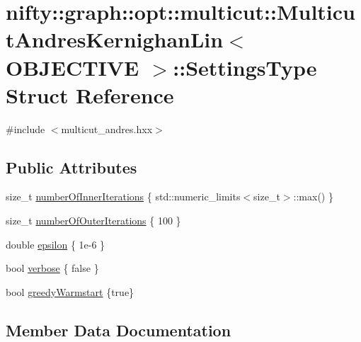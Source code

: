 \hypertarget{structnifty_1_1graph_1_1opt_1_1multicut_1_1MulticutAndresKernighanLin_1_1SettingsType}{}\section{nifty\+:\+:graph\+:\+:opt\+:\+:multicut\+:\+:Multicut\+Andres\+Kernighan\+Lin$<$ O\+B\+J\+E\+C\+T\+I\+VE $>$\+:\+:Settings\+Type Struct Reference}
\label{structnifty_1_1graph_1_1opt_1_1multicut_1_1MulticutAndresKernighanLin_1_1SettingsType}


{\ttfamily \#include $<$multicut\+\_\+andres.\+hxx$>$}

\subsection*{Public Attributes}
\begin{DoxyCompactItemize}
\item 
size\+\_\+t \hyperlink{structnifty_1_1graph_1_1opt_1_1multicut_1_1MulticutAndresKernighanLin_1_1SettingsType_a9c9cc17176564cb02ea05d0973564342}{number\+Of\+Inner\+Iterations} \{ std\+::numeric\+\_\+limits$<$size\+\_\+t$>$\+::max() \}
\item 
size\+\_\+t \hyperlink{structnifty_1_1graph_1_1opt_1_1multicut_1_1MulticutAndresKernighanLin_1_1SettingsType_a89795373789b533bdf9fd0282e0de45e}{number\+Of\+Outer\+Iterations} \{ 100 \}
\item 
double \hyperlink{structnifty_1_1graph_1_1opt_1_1multicut_1_1MulticutAndresKernighanLin_1_1SettingsType_aa62f466bdffff390631782fdc5932bdf}{epsilon} \{ 1e-\/6 \}
\item 
bool \hyperlink{structnifty_1_1graph_1_1opt_1_1multicut_1_1MulticutAndresKernighanLin_1_1SettingsType_a94b73e79e1469137c3b5b0109d9aff77}{verbose} \{ false \}
\item 
bool \hyperlink{structnifty_1_1graph_1_1opt_1_1multicut_1_1MulticutAndresKernighanLin_1_1SettingsType_a43281ae01e3e10d69b51176723721eff}{greedy\+Warmstart} \{true\}
\end{DoxyCompactItemize}


\subsection{Member Data Documentation}
\mbox{\label{structnifty_1_1graph_1_1opt_1_1multicut_1_1MulticutAndresKernighanLin_1_1SettingsType_aa62f466bdffff390631782fdc5932bdf}} 
